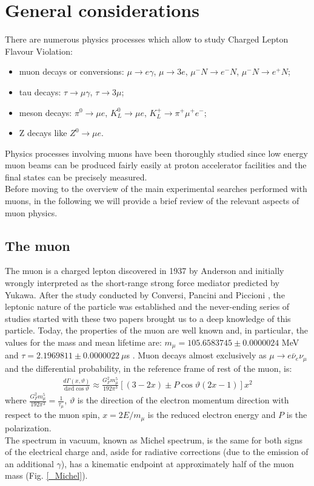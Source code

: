 \documentclass[12pt,a4paper,openright, oneside, titlepage]{book} %
\begin{document}
\section{General considerations}
There are numerous physics processes which allow to study Charged Lepton Flavour Violation:
\begin{itemize}
\item muon decays or conversions: 
$\mu\rightarrow e \gamma$, $\mu\rightarrow 3e$, $\mu^- N\rightarrow e^- N$, $\mu^- N\rightarrow e^+ N$; 
\item tau decays: $\tau\rightarrow \mu \gamma$, $\tau\rightarrow 3\mu$;
\item meson decays: $\pi^0\rightarrow \mu e$, $K_L^0\rightarrow\mu e$, $K_L^+\rightarrow \pi^+ \mu^+ e^-$;
\item Z decays like $Z^0\rightarrow\mu e$.
\end{itemize}
Physics processes involving muons have been thoroughly studied 
since low energy muon beams can be produced fairly easily 
at proton accelerator facilities and the final states can be precisely measured.\\
Before moving to the overview of the main experimental searches performed 
with muons, in the following we will provide a brief review 
of the relevant aspects of muon physics.

\subsection{The muon}
\label{muon}
The muon is a charged lepton discovered in 1937 by Anderson \cite{Anderson} 
and initially wrongly interpreted as the short-range strong force mediator predicted by Yukawa. 
After the study conducted by Conversi, Pancini and Piccioni \cite{ConvPancPicc}, 
the leptonic nature of the particle was established and the never-ending series of studies started 
with these two papers brought us to a deep knowledge of this particle. 
Today, the properties of the muon are well known and, in particular, the values for the mass and  mean lifetime are: 
$m_\mu = 105.6583745 \pm 0.0000024 $ MeV and $\tau =  2.1969811 \pm 0.0000022 \ \mu$s \cite{PDG}.
Muon decays almost exclusively as $\mu\rightarrow e\bar{\nu}_e\nu_{\mu}$ 
and the differential probability, in the reference frame of rest of the muon, is:
\begin{align}
\frac{d\Gamma(x,\vartheta)}{\mathrm dx \mathrm d\cos\vartheta}\approx \frac{G_F^2m_\mu^5}{192\pi^3}[(3-2x)\pm P\cos\vartheta(2x-1)]x^2
\label{eq_muon}
\end{align}
where $\frac{G_F^2m_\mu^5}{192\pi^3}=\frac{1}{\tau_\mu}$, $\vartheta$ 
is the direction of the electron momentum direction with respect to the muon spin, 
$x=2E/m_{\mu}$ is the reduced electron energy and $P$ is the polarization.\\
The spectrum in vacuum, known as Michel spectrum, 
is the same for both signs of the electrical charge and, 
aside for radiative corrections (due to the emission of an additional $\gamma$), 
has a kinematic endpoint at approximately half of the muon mass (Fig. \ref{_Michel}).\\
\end{document}

